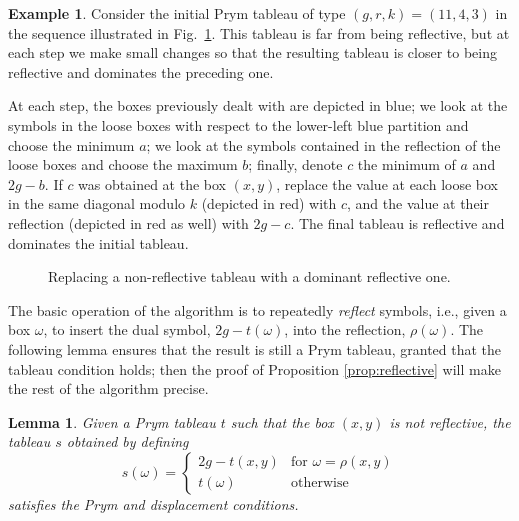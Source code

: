 \documentclass[11pt,reqno]{amsart}
\theoremstyle{definition}
\theoremstyle{problem}
\newtheorem{example}[definition]{Example}
\theoremstyle{plain}
\newtheorem{lemma}[definition]{Lemma}
\theoremstyle{remark}
\theoremstyle{theorem}
\numberwithin{equation}{section}
\numberwithin{figure}{section}
\begin{document}
\begin{example}\label{ex:1}
  Consider the initial Prym tableau of type $(g,r,k)=(11,4,3)$ in the sequence
  illustrated in Fig.~\ref{fig:reflective}.  This tableau is far from
  being reflective, but at each step we make small changes so that the
  resulting tableau is closer to being reflective and dominates the
  preceding one.  
  
 
  At each step, the boxes previously dealt with are depicted in blue;
  we look at the symbols in the loose boxes with respect to the
  lower-left blue partition and choose the minimum $a$; we look at the
  symbols contained in the reflection of the loose boxes and choose
  the maximum $b$; finally, denote $c$ the minimum of $a$ and $2g-b$.
  If $c$ was obtained at the box $(x,y)$, replace the value at each
  loose box in the same diagonal modulo $k$ (depicted in red) with $c$,
  and the value at their reflection (depicted in red as well) with
  $2g-c$. The final tableau is reflective and dominates the initial
  tableau.

  \begin{figure}[H]
    
    \caption{Replacing a non-reflective tableau with a dominant
      reflective one.}
    \label{fig:reflective}
  \end{figure}
\end{example}

The basic operation of the algorithm is to repeatedly \textit{reflect}
symbols, i.e., given a box $\omega$, to insert the dual symbol,
$2g - t(\omega)$, into the reflection, $\rho(\omega)$.  The following
lemma ensures that the result is still a Prym tableau, granted that
the tableau condition holds; then the proof of Proposition
\ref{prop:reflective} will make the rest of the algorithm precise.

\begin{lemma}\label{lem:5}
  Given a Prym tableau $t$ such that the box $(x,y)$ is not
  reflective, the tableau $s$ obtained by defining  
  \begin{equation}\label{eq:18}
    s(\omega) =    
    \begin{cases}
      2g - t(x,y) &\text{for } \omega = \rho(x,y) \\
      t(\omega) &\text{otherwise}
    \end{cases}
  \end{equation}
  satisfies the Prym and displacement conditions.
\end{lemma}
\end{document}
